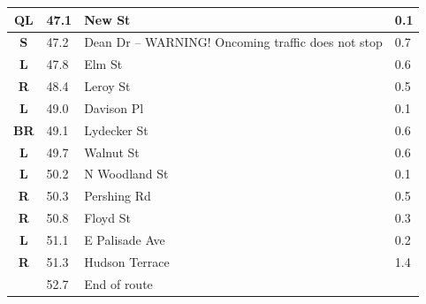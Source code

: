 \documentclass[11pt]{article}
\begin{document}
\begin{center}
\begin{supertabular}{|c|p{0.30in}|p{2.25in}|l|}
 \textbf{QL} &  47.1 & New St &   0.1 \\ \hline
 \textbf{S} &  47.2 & Dean Dr -- WARNING! Oncoming traffic does not stop &   0.7 \\ \hline
 \textbf{L} &  47.8 & Elm St &   0.6 \\ \hline
{} \textbf{R} &  48.4 & Leroy St &   0.5 \\ \hline
 \textbf{L} &  49.0 & Davison Pl &   0.1 \\ \hline
{} \textbf{BR} &  49.1 & Lydecker St &   0.6 \\ \hline
 \textbf{L} &  49.7 & Walnut St &   0.6 \\ \hline
 \textbf{L} &  50.2 & N Woodland St &   0.1 \\ \hline
{} \textbf{R} &  50.3 & Pershing Rd &   0.5 \\ \hline
{} \textbf{R} &  50.8 & Floyd St &   0.3 \\ \hline
 \textbf{L} &  51.1 & E Palisade Ave &   0.2 \\ \hline
{} \textbf{R} &  51.3 & Hudson Terrace &   1.4 \\ \hline
{} \textbf{} &  52.7 & End of route &  \\ \hline

\end{supertabular}
\end{center}
\end{document}
